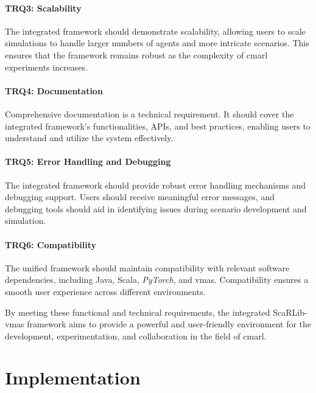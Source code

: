\documentclass[12pt,a4paper,openright,twoside]{book}
\begin{document}
\subsubsection{TRQ3: Scalability}
The integrated framework should demonstrate scalability, allowing users to scale simulations to handle larger numbers of agents and more intricate scenarios. This ensures that the framework remains robust as the complexity of \ac{cmarl} experiments increases.

\subsubsection{TRQ4: Documentation}
Comprehensive documentation is a technical requirement. It should cover the integrated framework's functionalities, APIs, and best practices, enabling users to understand and utilize the system effectively.

\subsubsection{TRQ5: Error Handling and Debugging}
The integrated framework should provide robust error handling mechanisms and debugging support. Users should receive meaningful error messages, and debugging tools should aid in identifying issues during scenario development and simulation.

\subsubsection{TRQ6: Compatibility}
The unified framework should maintain compatibility with relevant software dependencies, including Java, Scala, \emph{PyTorch}, and \ac{vmas}. Compatibility ensures a smooth user experience across different environments.

By meeting these functional and technical requirements, the integrated ScaRLib-\ac{vmas} framework aims to provide a powerful and user-friendly environment for the development, experimentation, and collaboration in the field of \ac{cmarl}.

\newpage

\chapter{Implementation} %
\label{chap:implementation}
\end{document}
